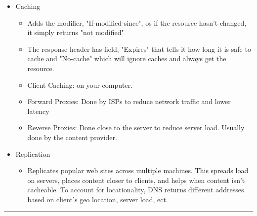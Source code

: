 \documentclass[3pt,landscape]{article}
\begin{document}
\begin{multicols}{3}
\begin{tabular}{|l|c|c|}
    \hline
\end{tabular}
\begin{itemize}
    \item Caching
        \begin{itemize}
            \item Adds the modifier, "If-modified-since", os if the resource hasn't changed, it simply returns "not modified"
            \item The response header has field, "Expires" that tells it how long it is safe to cache and "No-cache" which will ignore caches and always get the resource.
            \item Client Caching: on your computer.
            \item Forward Proxies: Done by ISPs to reduce network traffic and lower latency
            \item Reverse Proxies: Done close to the server to reduce server load. Usually done by the content provider.
        \end{itemize}
    \item Replication
        \begin{itemize}
            \item Replicates popular web sites across multiple machines. This spreads load on servers, places content closer to clients, and helps when content isn't cacheable. To account for locationality, DNS returns different addresses based on client's geo location, server load, ect.
        \end{itemize}
\end{itemize}
\rule{0.3\linewidth}{0.25pt}
\scriptsize


\end{multicols}
\end{document}
